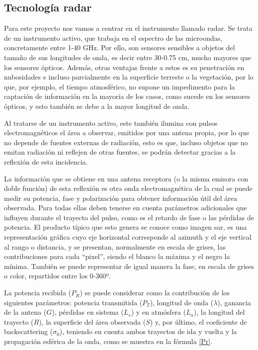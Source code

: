 \subsection{Tecnología radar}
\par Para este proyecto nos vamos a centrar en el instrumento llamado radar. Se trata de un instrumento activo, que trabaja en el espectro de las microondas, concretamente entre 1-40 GHz. Por ello, son sensores sensibles a objetos del tamaño de sus longitudes de onda, es decir entre 30-0.75 cm, mucho mayores que los sensores ópticos. Además, otras ventajas frente a estos es su penetración en nubosidades e incluso parcialmente en la superficie terreste o la vegetación, por lo que, por ejemplo, el tiempo atmosférico, no supone un impedimento para la captación de información en la mayoría de los casos, como sucede en los sensores ópticos, y esto también se debe a la mayor longitud de onda.
\\
\par Al tratarse de un instrumento activo, este también ilumina con pulsos electromagnéticos el área a observar, emitidos por una antena propia, por lo que no depende de fuentes externas de radiación, esto es que, incluso objetos que no emitan radiación ni reflejen de otras fuentes, se podrán detectar gracias a la reflexión de esta incidencia. 
\\ 
\par La información que se obtiene en una antena receptora (o la misma emisora con doble función) de esta reflexión es otra onda electromagnética de la cual se puede medir su potencia, fase y polarización para obtener información útil del área observada. Para todas ellas deben tenerse en cuenta parámetros adicionales que influyen durante el trayecto del pulso, como es el retardo de fase o las pérdidas de potencia. El producto típico que esto genera se conoce como imagen \gls{sar}, es una representación gráfica cuyo eje horizontal corresponde al azimuth y el eje vertical al rango o distancia, y se presentan, normalmente en escala de grises, las contribuciones para cada ``pixel'', siendo el blanco la máxima y el negro la mínima. También se puede representar de igual manera la fase, en escala de grises o color, repartidos entre los 0-360º.
\\
\par La potencia recibida ($P_{R}$) se puede considerar como la contribución de los siguientes parámetros: potencia transmitida ($P_{T}$), longitud de onda ($\lambda$), ganancia de la antena ($G$), pérdidas en sistema ($L_{s}$) y en atmósfera ($L_{a}$), la longitud del trayecto ($R$), la superficie del área observada ($S$) y, por último, el coeficiente de backscattering ($\sigma_{0}$), teniendo en cuenta ambos trayectos de ida y vuelta y la propagación esférica de la onda, como se muestra en la fórmula \ref{Pr}. 
